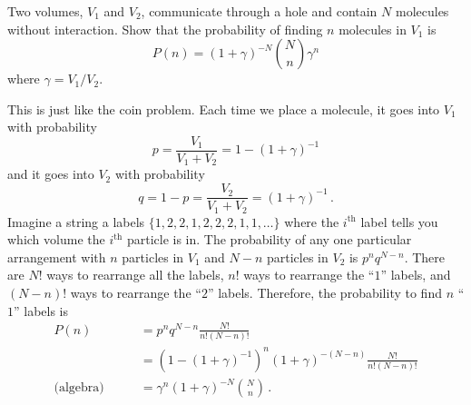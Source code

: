 

Two volumes, $V_1$ and $V_2$, communicate through a hole and contain $N$ molecules without interaction.
Show that the probability of finding $n$ molecules in $V_1$ is
\begin{equation*}
  P(n) = (1 + \gamma)^{-N} \binom{N}{n} \gamma^n
\end{equation*}
where $\gamma = V_1 / V_2$.


This is just like the coin problem.
Each time we place a molecule, it goes into $V_1$ with probability
\begin{equation*}
  p = \frac{V_1}{V_1 + V_2} = 1 - (1 + \gamma)^{-1}
\end{equation*}
and it goes into $V_2$ with probability
\begin{equation*}
  q = 1 - p = \frac{V_2}{V_1 + V_2} = (1 + \gamma)^{-1} \, .
\end{equation*}
Imagine a string a labels $\{1, 2, 2, 1, 2, 2, 2, 1, 1,\ldots\}$ where the $i^\text{th}$ label tells you which volume the $i^\text{th}$ particle is in.
The probability of any one particular arrangement with $n$ particles in $V_1$ and $N-n$ particles in $V_2$ is $p^n q^{N-n}$.
There are $N!$ ways to rearrange all the labels, $n!$ ways to rearrange the ``$1$'' labels, and $(N-n)!$ ways to rearrange the ``$2$'' labels.
Therefore, the probability to find $n$ ``$1$'' labels is
\begin{align*}
  P(n)
  &= p^n q^{N-n} \frac{N!}{n! (N-n)!} \\
  &= (1 - (1 + \gamma)^{-1})^n (1 + \gamma)^{-(N-n)} \frac{N!}{n! (N-n)!} \\
  \text{(algebra)} \qquad
  &= \gamma^n (1+\gamma)^{-N} \binom{N}{n}
  \, .
\end{align*}
